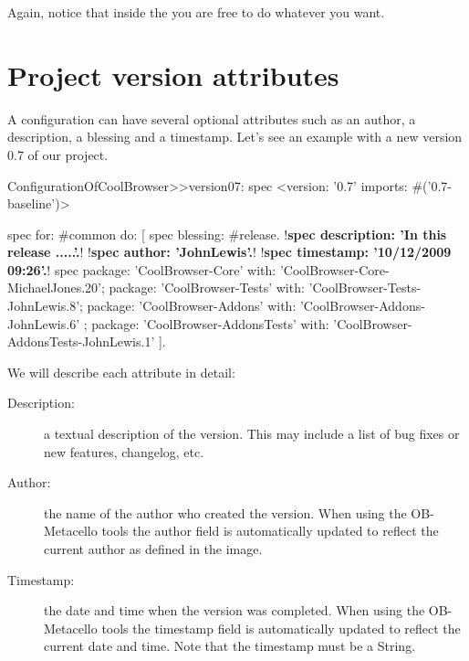 \documentclass[a4paper,10pt,twoside]{book}
\begin{document}
Again, notice that inside the  you are free to do whatever you want.

\section{Project version attributes}
 
 
A configuration can have several optional attributes such as    
an author, a description, a blessing and a timestamp.  Let's see an example with a new version 0.7 of our project.
 
\begin{code}{}
ConfigurationOfCoolBrowser>>version07: spec 
       <version: '0.7' imports: #('0.7-baseline')>
       
       spec for: #common do: [
              spec blessing: #release.
              !\textbf{spec description: 'In this release .....'.}!
              !\textbf{spec author: 'JohnLewis'.}!
              !\textbf{spec timestamp: '10/12/2009 09:26'.}!
              spec 
                     package: 'CoolBrowser-Core' with: 'CoolBrowser-Core-MichaelJones.20';
                     package: 'CoolBrowser-Tests' with: 'CoolBrowser-Tests-JohnLewis.8';
                     package: 'CoolBrowser-Addons' with: 'CoolBrowser-Addons-JohnLewis.6' ;
                     package: 'CoolBrowser-AddonsTests' with: 'CoolBrowser-AddonsTests-JohnLewis.1' ].
\end{code}
 
We will describe each attribute in detail:
 
\begin{description}

\item[ Description:] a textual description of the version. This may include a list of bug fixes or new features, changelog, etc.
\item[  Author:] the name of the author who created the version. When using the OB-Metacello tools the author field is automatically updated to reflect the current author as defined in the image.
\item[  Timestamp:] the date and time when the version was completed. When using the OB-Metacello tools the timestamp field is automatically updated to reflect the current date and time. Note that the timestamp must be a String.

\end{description}
\end{document}
